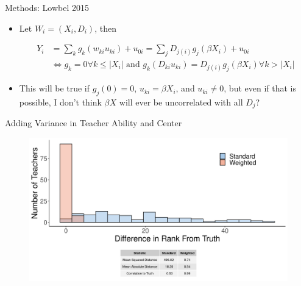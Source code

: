\documentclass[t,aspectratio=169,11pt]{beamer}
\begin{document}
\begin{frame}{Methods: Lowbel 2015}

\begin{itemize}
\item Let $W_i = (X_i,D_i)$, then 

\begin{align*}
    Y_i &= \sum_k g_k (w_{ki} u_{ki}) +u_{0i} = \sum _j D_{j(i)} g_j(\beta X_i) +u_{0i} \\
        & \iff g_k = 0 \forall k\leq |X_i| \text{ and } g_k(D_{ki} u_{ki}) = D_{j(i)} g_j(\beta X_i) \forall k>|X_i| 
\end{align*}

\item This will be true if $g_j(0)=0$, $u_{ki}=\beta X_i$, and $u_{ki}\neq 0$, but even if that is possible, I don't think $\beta X$ will ever be uncorrelated with all $D_j$?
\end{itemize}


\end{frame}


\begin{frame}{Adding Variance in Teacher Ability and Center}

\hypertarget{bins1}{}
\vfill

\begin{figure}
    \centering
 \includegraphics[width=.75\textwidth]{slides/CIERS_Figures/hist_run_3.png}
\end{figure}

\hyperlink{run4}{}

\end{frame}


\end{document}
